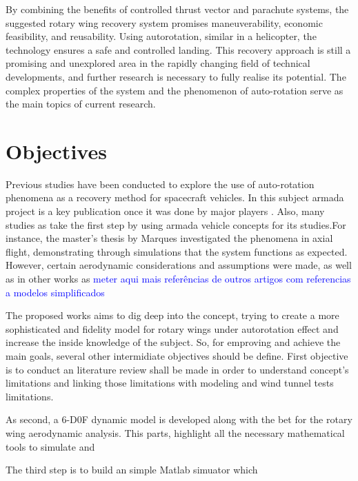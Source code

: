 By combining the benefits of controlled thrust vector and parachute systems, the suggested rotary wing recovery system promises maneuverability, economic feasibility, and reusability. Using autorotation, similar in a helicopter, the technology ensures a safe and controlled landing. This recovery approach is still a promising and unexplored area in the rapidly changing field of technical developments, and further research is necessary to fully realise its potential. The complex properties of the system and the phenomenon of auto-rotation serve as the main topics of current research.


\section{Objectives}
\label{section:objectives}


Previous studies have been conducted to explore the use of auto-rotation phenomena as a recovery method for spacecraft vehicles. In this subject \gls{armada} project \cite{noauthor_armada_nodate} is a key publication once it was done by major players . Also, many studies  as \cite{steiner_rotary_nodate} take the first step by using \gls{armada} vehicle concepts for its studies.For instance, the master's thesis by Marques \cite{marques_design_2024} investigated the phenomena in axial flight, demonstrating through simulations that the system functions as expected. However, certain aerodynamic considerations and assumptions were made, as well as in other works as \textcolor{blue}{meter aqui mais referências de outros artigos com referencias a modelos simplificados}

The proposed works aims to dig deep into the concept, trying to create a more sophisticated and fidelity model for rotary wings under autorotation effect and increase the inside knowledge of the subject. So, for emproving and achieve the main goals, several other intermidiate objectives should be define. First objective is to conduct an literature review shall be made in order to understand concept's limitations and linking those limitations with modeling and wind tunnel tests limitations.

As second, a 6-D0F dynamic model is developed along with the \gls{bet} for the rotary wing aerodynamic analysis. This parts, highlight all the necessary mathematical tools to simulate and 

The third step is to build an simple Matlab simuator which 



